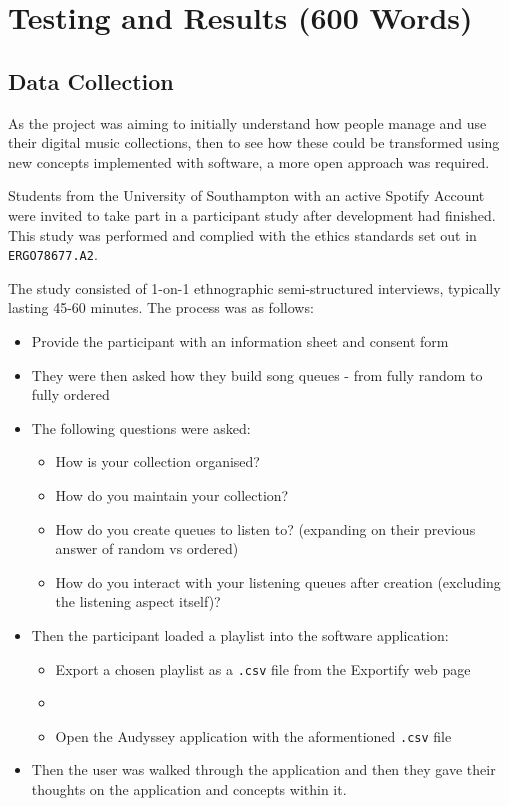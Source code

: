 \chapter{Testing and Results (600 Words)}
\section{Data Collection}
As the project was aiming to initially understand how people manage and use their digital music collections, then to see how these could be transformed using new concepts implemented with software, a more open approach was required.

Students from the University of Southampton with an active Spotify Account were invited to take part in a participant study after development had finished. This study was performed and complied with the ethics standards set out in \lstinline|ERGO78677.A2|.

The study consisted of 1-on-1 ethnographic semi-structured interviews, typically lasting 45-60 minutes. The process was as follows:\begin{itemize}
    \item Provide the participant with an information sheet and consent form
    \item They were then asked how they build song queues - from fully random to fully ordered
    \item The following questions were asked:\begin{itemize}
        \item How is your collection organised?
        \item How do you maintain your collection?
        \item How do you create queues to listen to? (expanding on their previous answer of random vs ordered)
        \item How do you interact with your listening queues after creation (excluding the listening aspect itself)?
    \end{itemize}
    \item Then the participant loaded a playlist into the software application:\begin{itemize}
        \item Export a chosen playlist as a \lstinline|.csv| file from the Exportify web page
        \item \item Open the Audyssey application with the aformentioned \lstinline|.csv| file
    \end{itemize}
    \item Then the user was walked through the application and then they gave their thoughts on the application and concepts within it.
\end{itemize}

